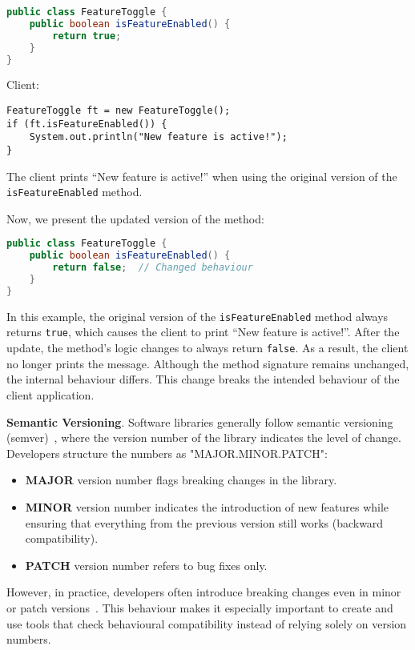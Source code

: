 \begin{itemize}
    \begin{lstlisting}[language=java]
public class FeatureToggle {
    public boolean isFeatureEnabled() {
        return true;
    }
}
    \end{lstlisting}
Client:
\begin{lstlisting}
FeatureToggle ft = new FeatureToggle();
if (ft.isFeatureEnabled()) {
    System.out.println("New feature is active!");
}
\end{lstlisting}
The client prints ``{New feature is active!}'' when using the original version of the \texttt{isFeatureEnabled}
method.

Now, we present the updated version of the method:
\begin{lstlisting}[language=java]
public class FeatureToggle {
    public boolean isFeatureEnabled() {
        return false;  // Changed behaviour
    }
}
\end{lstlisting}
In this example, the original version of the \texttt{isFeatureEnabled} method always returns \texttt{true},
which causes the client to print ``{New feature is active!}''. After the update, the method's logic changes
to always return \texttt{false}. As a result, the client no longer prints the message. Although the method
signature remains unchanged, the internal behaviour differs. This change breaks the intended behaviour
of the client application.
\end{itemize}

\textbf{Semantic Versioning}. Software libraries generally follow semantic versioning \\(semver)~\cite{preston-werner23:_seman_version}, where the version number of the library indicates the level of change. Developers structure the numbers as "MAJOR.MINOR.PATCH":
\begin{itemize}
    \item \textbf{MAJOR} version number flags breaking changes in the library.
    \item \textbf{MINOR} version number indicates the introduction of new features while ensuring that everything from the previous version still works (backward compatibility).
    \item \textbf{PATCH} version number refers to bug fixes only.
\end{itemize}
However, in practice, developers often introduce breaking changes even in minor or patch versions~\cite{jayasuriya24:_under_apis}. This behaviour makes it especially important to create and use tools that check behavioural compatibility instead of relying solely on version numbers.

